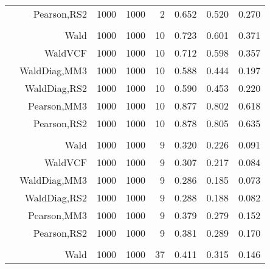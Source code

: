 \documentclass[
]{article}
\begin{document}
\begin{table}[H]
{\begin{tabular}[t]{lrrrrrrr}
\hspace{1em} & Pearson,RS2 & 1000 & 1000 & 2 & 0.652 & 0.520 & 0.270\\
\cmidrule{1-8}
\addlinespace[0.3em]
\multicolumn{8}{l}{\textbf{1F 15V}}\\
\hspace{1em} & Wald & 1000 & 1000 & 10 & 0.723 & 0.601 & 0.371\\

\hspace{1em} & WaldVCF & 1000 & 1000 & 10 & 0.712 & 0.598 & 0.357\\

\hspace{1em} & WaldDiag,MM3 & 1000 & 1000 & 10 & 0.588 & 0.444 & 0.197\\

\hspace{1em} & WaldDiag,RS2 & 1000 & 1000 & 10 & 0.590 & 0.453 & 0.220\\

\hspace{1em} & Pearson,MM3 & 1000 & 1000 & 10 & 0.877 & 0.802 & 0.618\\

\hspace{1em} & Pearson,RS2 & 1000 & 1000 & 10 & 0.878 & 0.805 & 0.635\\
\cmidrule{1-8}
\addlinespace[0.3em]
\multicolumn{8}{l}{\textbf{2F 10V}}\\
\hspace{1em} & Wald & 1000 & 1000 & 9 & 0.320 & 0.226 & 0.091\\

\hspace{1em} & WaldVCF & 1000 & 1000 & 9 & 0.307 & 0.217 & 0.084\\

\hspace{1em} & WaldDiag,MM3 & 1000 & 1000 & 9 & 0.286 & 0.185 & 0.073\\

\hspace{1em} & WaldDiag,RS2 & 1000 & 1000 & 9 & 0.288 & 0.188 & 0.082\\

\hspace{1em} & Pearson,MM3 & 1000 & 1000 & 9 & 0.379 & 0.279 & 0.152\\

\hspace{1em} & Pearson,RS2 & 1000 & 1000 & 9 & 0.381 & 0.289 & 0.170\\
\cmidrule{1-8}
\addlinespace[0.3em]
\multicolumn{8}{l}{\textbf{3F 15V}}\\
\hspace{1em} & Wald & 1000 & 1000 & 37 & 0.411 & 0.315 & 0.146\\


\end{tabular}}
\end{table}
\end{document}
